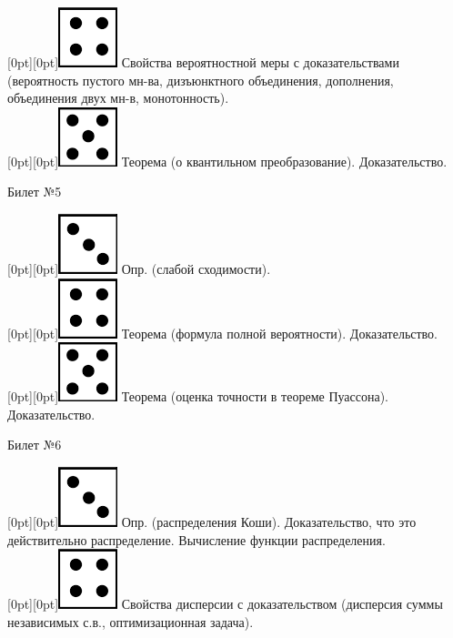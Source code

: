 \documentclass[10pt]{article}
\begin{document}
\raisebox{-1pt}[0pt][0pt]{\includegraphics[width=0.02\linewidth]{4.png}} Свойства вероятностной меры с доказательствами (вероятность пустого мн-ва, дизъюнктного объединения, дополнения, объединения двух мн-в, монотонность). \\

\raisebox{-1pt}[0pt][0pt]{\includegraphics[width=0.02\linewidth]{5.png}}  Теорема (о квантильном преобразование). Доказательство. \\

\begin{center} {\Large Билет №5} \end{center} 

\raisebox{-1pt}[0pt][0pt]{\includegraphics[width=0.02\linewidth]{3.png}} Опр. (слабой сходимости). \\

\raisebox{-1pt}[0pt][0pt]{\includegraphics[width=0.02\linewidth]{4.png}} Теорема (формула полной вероятности). Доказательство. \\

\raisebox{-1pt}[0pt][0pt]{\includegraphics[width=0.02\linewidth]{5.png}} Теорема (оценка точности в теореме Пуассона). Доказательство. \\

\begin{center} {\Large Билет №6} \end{center} 

\raisebox{-1pt}[0pt][0pt]{\includegraphics[width=0.02\linewidth]{3.png}} Опр. (распределения Коши). Доказательство, что это действительно распределение. Вычисление функции распределения. \\

\raisebox{-1pt}[0pt][0pt]{\includegraphics[width=0.02\linewidth]{4.png}} Свойства дисперсии с доказательством (дисперсия суммы независимых с.в., оптимизационная задача). \\ 
\end{document}
